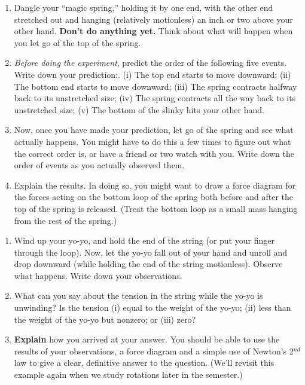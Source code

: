 \begin{exercise}
  \begin{enumerate}
  \item Dangle your ``magic spring,'' holding it by one end, with the
    other end stretched out and hanging (relatively motionless) an
    inch or two above your other hand.  \textbf{Don't do anything yet.}
    Think about what will happen when you let go of the top of the
    spring.

  \item \emph{Before doing the experiment}, predict the order of the
    following five events.  Write down your prediction:. (i) The top
    end starts to move downward; (ii) The bottom end starts to move
    downward; (iii) The spring contracts halfway back to its
    unstretched size; (iv) The spring contracts all the way back to
    its unstretched size; (v) The bottom of the slinky hits your other
    hand.

  \item Now, once you have made your prediction, let go of the spring
    and see what actually happens.  You might have to do this a few
    times to figure out what the correct order is, or have a friend or
    two watch with you.  Write down the order of events as you
    actually observed them.

  \item Explain the results.  In doing so, you might want to draw a
    force diagram for the forces acting on the bottom loop of the
    spring both before and after the top of the spring is released.
    (Treat the bottom loop as a small mass hanging from the rest of
    the spring.)
  \end{enumerate}
\end{exercise}


\begin{exercise}
  \begin{enumerate}
  \item Wind up your yo-yo, and hold the end of the string (or put
    your finger through the loop).  Now, let the yo-yo fall out of
    your hand and unroll and drop downward (while holding the end of
    the string motionless).  Observe what happens.  Write down your
    observations.

  \item What can you say about the tension in the string while the
    yo-yo is unwinding?  Is the tension (i) equal to the weight of the
    yo-yo; (ii) less than the weight of the yo-yo but nonzero; 
    or (iii) zero?

  \item \textbf{Explain} how you arrived at your answer.  You should be
    able to use the results of your observations, a force diagram and
    a simple use of Newton's 2$^{ nd}$ law to give a clear,
    definitive answer to the question. (We'll revisit this example
    again when we study rotations later in the semester.)

  \end{enumerate}
\label{prob:yoyoI}
\end{exercise}


